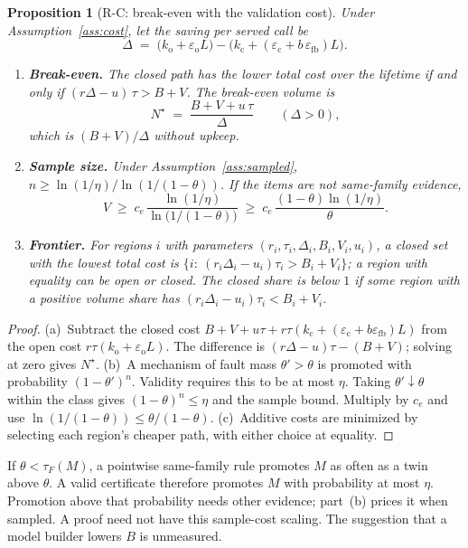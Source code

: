 \documentclass[11pt]{article}
\newtheorem{proposition}{Proposition}
\theoremstyle{definition}
\theoremstyle{remark}
\newcommand{\eop}{\varepsilon_{\mathrm{o}}}
\newcommand{\ecl}{\varepsilon_{\mathrm{c}}}
\begin{document}
\begin{proposition}[R-C: break-even with the validation cost]\label{prop:rc}
Under Assumption~\ref{ass:cost}, let the saving per served call be
\[
\Delta\;=\;\bigl(k_{\mathrm{o}}+\eop L\bigr)-\bigl(k_{\mathrm{c}}+(\ecl+b\,\varepsilon_{\mathrm{fb}})L\bigr).
\]
\begin{enumerate}[label=\textup{(\alph*)},leftmargin=2em,itemsep=3pt]
\item \textbf{Break-even.} The closed path has the lower total cost over the lifetime if and only if
$(r\Delta-u)\,\tau>B+V$. The break-even volume is
\[
N^\star\;=\;\frac{B+V+u\,\tau}{\Delta}\qquad(\Delta>0),
\]
which is $(B+V)/\Delta$ without upkeep.
\item \textbf{Sample size.} Under Assumption~\ref{ass:sampled},
$n\ge\ln(1/\eta)/\ln(1/(1-\theta))$. If the items are not same-family evidence,
\[
V\;\ge\;c_e\,\frac{\ln(1/\eta)}{\ln\bigl(1/(1-\theta)\bigr)}\;\ge\;c_e\,\frac{(1-\theta)\ln(1/\eta)}{\theta}.
\]
\item \textbf{Frontier.} For regions $i$ with parameters
$(r_i,\tau_i,\Delta_i,B_i,V_i,u_i)$, a closed set with the lowest total cost is
$\{i:\ (r_i\Delta_i-u_i)\tau_i>B_i+V_i\}$; a region with equality can be open or closed. The closed
share is below $1$ if some region with a positive volume share has
$(r_i\Delta_i-u_i)\tau_i<B_i+V_i$.
\end{enumerate}
\end{proposition}
\begin{proof}
(a)~Subtract the closed cost
$B+V+u\tau+r\tau(k_{\mathrm{c}}+(\ecl+b\varepsilon_{\mathrm{fb}})L)$
from the open cost $r\tau(k_{\mathrm{o}}+\eop L)$.
The difference is $(r\Delta-u)\tau-(B+V)$; solving at zero gives $N^\star$.
(b)~A mechanism of fault mass $\theta'>\theta$ is promoted with probability $(1-\theta')^n$.
Validity requires this to be at most $\eta$.
Taking $\theta'\downarrow\theta$ within the class gives $(1-\theta)^n\le\eta$ and the sample bound.
Multiply by $c_e$ and use $\ln(1/(1-\theta))\le\theta/(1-\theta)$.
(c)~Additive costs are minimized by selecting each region's cheaper path, with either choice at equality.
\end{proof}

If $\theta<\tau_F(M)$, a pointwise same-family rule promotes $M$ as often as a twin above
$\theta$. A valid certificate therefore promotes $M$ with probability at most $\eta$.
Promotion above that probability needs other evidence; part~(b) prices it when sampled.
A proof need not have this sample-cost scaling.
The suggestion that a model builder lowers $B$ is unmeasured.
\end{document}
